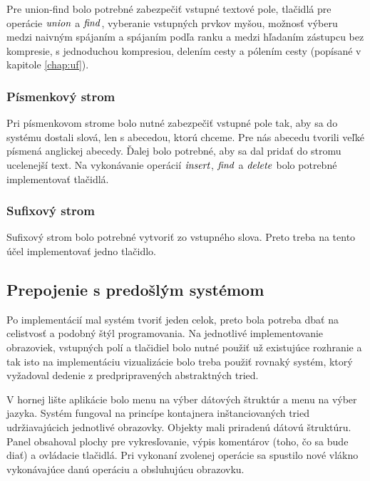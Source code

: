 Pre union-find bolo potrebné zabezpečiť vstupné textové pole, tlačidlá pre 
operácie $\mathop{\mathit{union}}$ a $\mathop{\mathit{find}}$, vyberanie vstupných prvkov myšou, možnosť výberu 
medzi naivným spájaním a spájaním podľa ranku a medzi hľadaním zástupcu bez 
kompresie, s jednoduchou kompresiou, delením cesty a pólením cesty (popísané 
v kapitole \ref{chap:uf}).

\subsubsection{Písmenkový strom}

Pri písmenkovom strome bolo nutné zabezpečiť vstupné pole tak, aby sa do systému 
dostali slová, len s abecedou, ktorú chceme. Pre nás abecedu tvorili veľké 
písmená anglickej abecedy. Ďalej bolo potrebné, aby sa dal pridať do stromu 
ucelenejší text. Na vykonávanie operácií $\mathop{\mathit{insert}}$, $\mathop{\mathit{find}}$ a $\mathop{\mathit{delete}}$ bolo 
potrebné implementovať tlačidlá.

\subsubsection{Sufixový strom}

Sufixový strom bolo potrebné vytvoriť zo vstupného slova. Preto treba na tento 
účel implementovať jedno tlačidlo.

\subsection{Prepojenie s predošlým systémom}

Po implementácií mal systém tvoriť jeden celok, preto bola potreba dbať na 
celistvosť a podobný štýl programovania. Na jednotlivé implementovanie 
obrazoviek, vstupných polí a tlačidiel bolo nutné použiť už existujúce 
rozhranie a tak isto na implementáciu vizualizácie bolo treba použiť rovnaký 
systém, ktorý vyžadoval dedenie z predpripravených abstraktných tried. 

V hornej lište aplikácie bolo menu na výber dátových štruktúr a menu 
na výber jazyka. Systém fungoval na princípe kontajnera inštanciovaných tried 
udržiavajúcich jednotlivé obrazovky. Objekty mali priradenú dátovú štruktúru. 
Panel obsahoval plochy pre vykresľovanie, výpis komentárov (toho, čo sa bude 
diať) a ovládacie tlačidlá. Pri vykonaní zvolenej operácie sa spustilo nové 
vlákno vykonávajúce danú operáciu a obsluhujúcu obrazovku.

